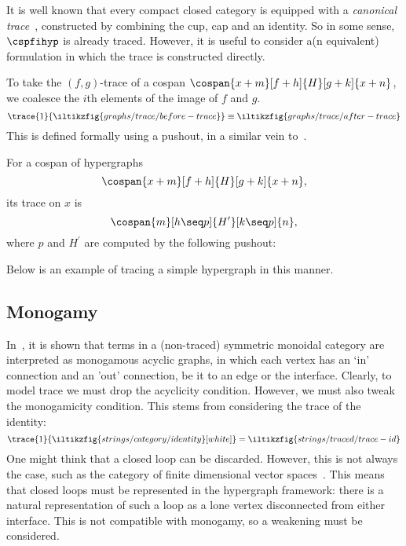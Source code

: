 It is well known that every compact closed category is equipped with a \emph{canonical trace}~\cite{joyal1996traced}, constructed by combining the cup, cap and an identity.
So in some sense, \(\cspfihyp\) is already traced.
However, it is useful to consider a(n equivalent) formulation in which the trace is constructed directly.

To take the \((f,g)\)-trace of a cospan \(\cospan{x+m}[f+h]{H}[g+k]{x+n}\), we coalesce the \(i\)th elements of the image of \(f\) and \(g\).
\[
    \trace{1}{\iltikzfig{graphs/trace/before-trace}}
    \equiv
    \iltikzfig{graphs/trace/after-trace}
\]
This is defined formally using a pushout, in a similar vein to~\cite{dixon2013opengraphs}.

\begin{definition}
    For a cospan of hypergraphs \[\cospan{x+m}[f+h]{H}[g+k]{x+n},\] its trace on \(x\) is \[\cospan{m}[h \seq p]{H^\prime}[k \seq p]{n},\] where \(p\) and \(H^\prime\) are computed by the following pushout:
    \begin{center}
    \end{center}
\end{definition}

\begin{example}
    Below is an example of tracing a simple hypergraph in this manner.
    \begin{center}
    \end{center}
\end{example}

\subsection{Monogamy}

In~\cite{bonchi2016rewriting}, it is shown that terms in a (non-traced) symmetric monoidal category are interpreted as monogamous acyclic graphs, in which each vertex has an `in' connection and an 'out' connection, be it to an edge or the interface.
Clearly, to model trace we must drop the acyclicity condition.
However, we must also tweak the monogamicity condition.
This stems from considering the trace of the identity:
\[
    \trace{1}{\iltikzfig{strings/category/identity}[white]}
    =
    \iltikzfig{strings/traced/trace-id}
\]
\noindent
One might think that a closed loop can be discarded.
However, this is not always the case, such as the category of finite dimensional vector spaces~\cite[Sec. 6.1]{hasegawa1997recursion}.
This means that closed loops must be represented in the hypergraph framework: there is a natural representation of such a loop as a lone vertex disconnected from either interface.
This is not compatible with monogamy, so a weakening must be considered.

